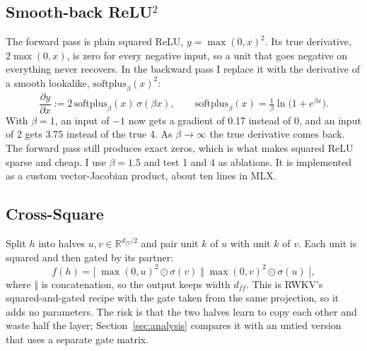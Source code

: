 \documentclass{article}
\begin{document}
\subsection{\texorpdfstring{Smooth-back ReLU$^2$}{Smooth-back ReLU2}}

The forward pass is plain squared ReLU, $y = \max(0,x)^2$.
Its true derivative, $2\max(0,x)$, is zero for every negative input, so a unit that goes negative on everything never recovers.
In the backward pass I replace it with the derivative of a smooth lookalike, $\mathrm{softplus}_\beta(x)^2$:
\begin{equation}
  \label{eq:smooth}
  \frac{\partial y}{\partial x} := 2\, \mathrm{softplus}_\beta(x)\, \sigma(\beta x), \qquad \mathrm{softplus}_\beta(x) = \tfrac{1}{\beta} \ln\big(1 + e^{\beta x}\big).
\end{equation}
With $\beta = 1$, an input of $-1$ now gets a gradient of 0.17 instead of 0, and an input of 2 gets 3.75 instead of the true 4.
As $\beta \to \infty$ the true derivative comes back.
The forward pass still produces exact zeros, which is what makes squared ReLU sparse and cheap.
I use $\beta = 1.5$ and test 1 and 4 as ablations.
It is implemented as a custom vector-Jacobian product, about ten lines in MLX.

\subsection{Cross-Square}

Split $h$ into halves $u, v \in \mathbb{R}^{d_{ff}/2}$ and pair unit $k$ of $u$ with unit $k$ of $v$.
Each unit is squared and then gated by its partner:
\begin{equation}
  \label{eq:cross}
  f(h) = \Big[\; \max(0,u)^2 \odot \sigma(v) \;\Big\Vert\; \max(0,v)^2 \odot \sigma(u) \;\Big],
\end{equation}
where $\Vert$ is concatenation, so the output keeps width $d_{ff}$.
This is RWKV's squared-and-gated recipe with the gate taken from the same projection, so it adds no parameters.
The risk is that the two halves learn to copy each other and waste half the layer; Section~\ref{sec:analysis} compares it with an untied version that uses a separate gate matrix.
\end{document}
